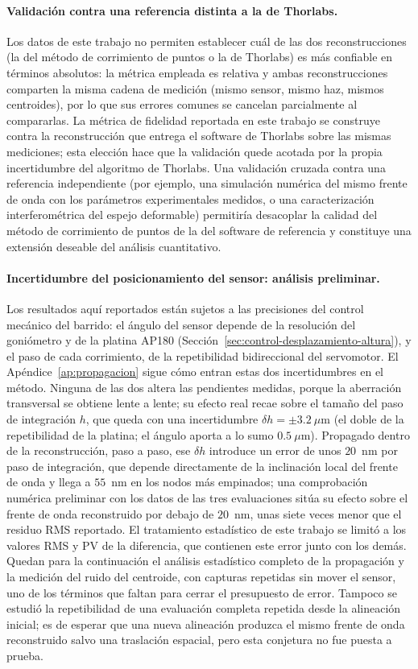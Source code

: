\documentclass[letterpaper,12pt,oneside]{book}
\begin{document}
\paragraph{Validación contra una referencia distinta a la de Thorlabs.} Los datos de
este trabajo no permiten establecer cuál de las dos reconstrucciones (la del método de
corrimiento de puntos o la de Thorlabs) es más confiable en términos absolutos: la
métrica empleada es relativa y ambas reconstrucciones comparten la misma cadena de
medición (mismo sensor, mismo haz, mismos centroides), por lo que sus errores comunes se
cancelan parcialmente al compararlas. La métrica de fidelidad reportada en este trabajo se
construye contra la reconstrucción que entrega el software de Thorlabs sobre las mismas
mediciones; esta elección hace que la validación quede acotada por la propia incertidumbre
del algoritmo de Thorlabs. Una validación cruzada contra una referencia independiente
(por ejemplo, una simulación numérica del mismo frente de onda con los parámetros
experimentales medidos, o una caracterización interferométrica del espejo deformable)
permitiría desacoplar la calidad del método de corrimiento de puntos de la del software de
referencia y constituye una extensión deseable del análisis cuantitativo.

\paragraph{Incertidumbre del posicionamiento del sensor: análisis preliminar.} Los
resultados aquí reportados están sujetos a las precisiones del control mecánico del
barrido: el ángulo del sensor depende de la resolución del goniómetro y de la platina
AP180 (Sección~\ref{sec:control-desplazamiento-altura}), y el paso de cada corrimiento,
de la repetibilidad bidireccional del servomotor. El Apéndice~\ref{ap:propagacion} sigue
cómo entran estas dos incertidumbres en el método. Ninguna de las dos altera las
pendientes medidas, porque la aberración transversal se obtiene lente a lente; su efecto
real recae sobre el tamaño del paso de integración $h$, que queda con una incertidumbre
$\delta h = \pm 3.2~\mu$m (el doble de la repetibilidad de la platina; el ángulo aporta a
lo sumo $0.5~\mu$m). Propagado dentro de la reconstrucción, paso a paso, ese $\delta h$ introduce
un error de unos $20$~nm por paso de integración, que depende directamente de la
inclinación local del frente de onda y llega a $55$~nm en los nodos más empinados; una
comprobación numérica preliminar con los datos de las tres evaluaciones sitúa su efecto
sobre el frente de onda reconstruido por debajo de $20$~nm, unas siete veces menor que
el residuo RMS reportado. El tratamiento estadístico de este trabajo se limitó a los valores
RMS y PV de la diferencia, que contienen este error junto con los demás. Quedan para la
continuación el análisis estadístico completo de la propagación y la medición del ruido
del centroide, con capturas repetidas sin mover el sensor, uno de los términos que
faltan para cerrar el presupuesto de error. Tampoco se estudió la repetibilidad de una
evaluación completa repetida desde la alineación inicial; es de esperar que una nueva
alineación produzca el mismo frente de onda reconstruido salvo una traslación espacial,
pero esta conjetura no fue puesta a prueba.
\end{document}
